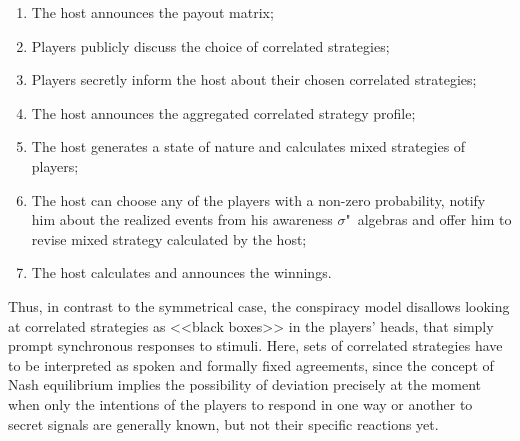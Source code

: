 \begin{enumerate}
	\item The host announces the payout matrix; %
	\item Players publicly discuss the choice of correlated strategies; %
	\item Players secretly inform the host about their chosen correlated strategies; %
	\item The host announces the aggregated correlated strategy profile; %
	\item The host generates a state of nature and calculates mixed strategies of players; %
	\item The host can choose any of the players with a non-zero probability, notify him about the realized events from his awareness $\sigma$"~algebras and offer him to revise mixed strategy calculated by the host; %
	\item The host calculates and announces the winnings. %
\end{enumerate}

Thus, in contrast to the symmetrical case, the conspiracy model disallows looking at correlated strategies as <<black boxes>> in the players' heads, that simply prompt synchronous responses to stimuli. Here, sets of correlated strategies have to be interpreted as spoken and formally fixed agreements, since the concept of Nash equilibrium implies the possibility of deviation precisely at the moment when only the intentions of the players to respond in one way or another to secret signals are generally known, but not their specific reactions yet. %

